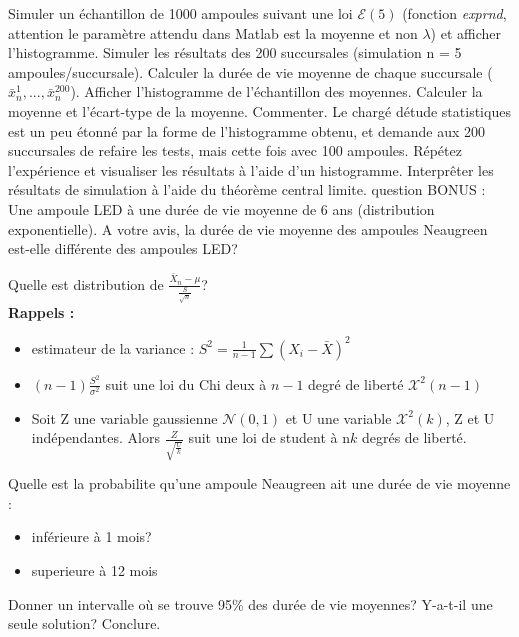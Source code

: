 \documentclass[12pt,paper=a4,answers]{exam}
\begin{document}
 \begin{questions}  
 \question Simuler un \'echantillon de 1000 ampoules suivant une loi $\mathcal{E}(5)$ (fonction \textit{exprnd}, attention le param\`etre attendu dans Matlab est la moyenne et non $\lambda$) et afficher l'histogramme.
 \question Simuler les r\'esultats des 200 succursales (simulation n = 5 ampoules/succursale). Calculer la dur\'ee de vie moyenne de chaque succursale ($\bar{x}_{n}^1,...,\bar{x}_{n}^{200}$). 
 \question Afficher l'histogramme de l'\'echantillon des moyennes. Calculer la moyenne et l'\'ecart-type de la moyenne. Commenter.
  \question Le charg\'e d\'etude statistiques est un peu \'etonn\'e par la forme de l'histogramme obtenu, et demande aux 200 succursales de refaire les tests, mais cette fois avec 100 ampoules. R\'ep\'etez l'exp\'erience et visualiser les r\'esultats à l'aide d'un histogramme. 
  \question Interpr\^eter les r\'esultats de simulation \`a l'aide du th\'eor\`eme central limite. 
 \question question BONUS : Une ampoule LED \`a une dur\'ee de vie moyenne de 6 ans (distribution exponentielle). A votre avis, la dur\'ee de vie moyenne des ampoules Neaugreen est-elle diff\'erente des ampoules LED?
\begin{questions}
\question Quelle est distribution de $\frac{\bar{X}_n-\mu}{\frac{S}{\sqrt{n}}}$?\\
  \textbf{Rappels :} 
  \begin{itemize}
  \item estimateur de la variance : $S^2 = \frac{1}{n-1}\sum(X_i-\bar{X})^2$
  \item $(n-1)\frac{S^2}{\sigma^2}$ suit une loi du Chi deux \`a $n-1$ degr\'e de libert\'e $\mathcal{X}^2(n-1)$
  \item Soit Z une variable gaussienne $\mathcal{N}(0,1)$ et U une variable $\mathcal{X}^2(k)$, Z et U ind\'ependantes. Alors $\frac{Z}{\sqrt{\frac{U}{k}}}$ suit une loi de student \`a n$k$ degr\'es de libert\'e.
  \end{itemize}
  \question Quelle est la probabilite qu'une ampoule Neaugreen ait une dur\'ee de vie moyenne :
    	\begin{itemize}
 	\item inf\'erieure \`a  1 mois?
	\item superieure \`a 12 mois
   \end{itemize}
     
\question Donner un intervalle o\`u se trouve 95\% des dur\'ee de vie moyennes? Y-a-t-il une seule solution? 
\question Conclure.	 
  \end{questions}
\end{questions}


 
\end{document}
